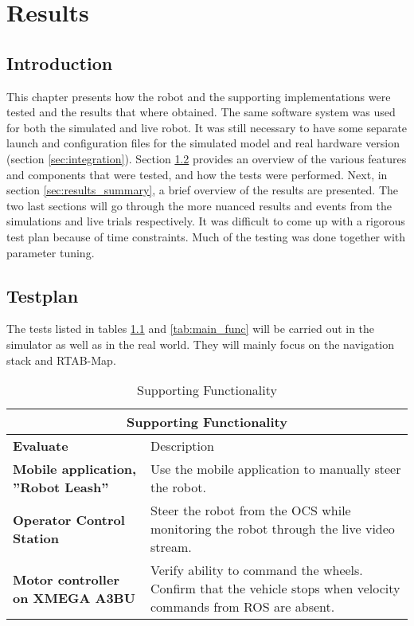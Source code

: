 \chapter{Results}
\label{chp:results} 

\section{Introduction}

This chapter presents how the robot and the supporting implementations were tested and the results that where obtained. The same software system was used for both the simulated and live robot. It was still necessary to have some separate launch and configuration files for the simulated model and real hardware version (section \ref{sec:integration}). Section \ref{sec:testplan} provides an overview of the various features and components that were tested, and how the tests were performed. Next, in section \ref{sec:results_summary}, a brief overview of the results are presented. The two last sections will go through the more nuanced results and events from the simulations and live trials respectively. It was difficult to come up with a rigorous test plan because of time constraints. Much of the testing was done together with parameter tuning. 


\section{Testplan}
\label{sec:testplan}
The tests listed in tables \ref{tab:support_func} and \ref{tab:main_func} will be carried out in the simulator as well as in the real world. They will mainly focus on the navigation stack and \ac{RTAB-Map}. 

\begin{table}
	\centering
	\begin{tabular}{ p{3.5cm} | p{7cm} }
		\multicolumn{2}{c}{Supporting Functionality}\\
		\hline
		\textbf{Evaluate} & Description\\
		\hline\hline
		\textbf{Mobile application, ''Robot Leash''} & Use the mobile application to manually steer the robot.\\
		\hline
		\textbf{Operator Control Station} & Steer the robot from the \ac{OCS} while monitoring the robot through the live video stream. \\
		\hline
		\textbf{Motor controller on XMEGA A3BU} & Verify ability to command the wheels. Confirm that the vehicle stops when velocity commands from \ac{ROS} are absent.\\
		\hline
	\end{tabular}
	\caption{Supporting Functionality}\label{tab:support_func}
\end{table}

